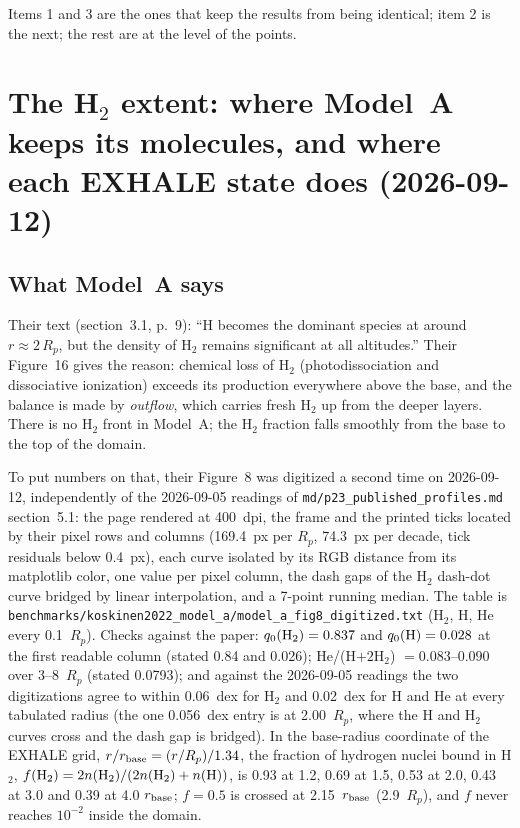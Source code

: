 \documentclass[english,a4paper]{my_memo}
\begin{document}
Items 1 and 3 are the ones that keep the results from being identical;
item 2 is the next; the rest are at the level of the points.


\section{The H$_2$ extent: where Model~A keeps its molecules, and where each EXHALE state does (2026-09-12)}
\label{sec:h2extent}

\subsection{What Model~A says}

Their text (section~3.1, p.~9): ``H becomes the dominant species at around
$r \approx 2\,R_p$, but the density of H$_2$ remains significant at all
altitudes.'' Their Figure~16 gives the reason: chemical loss of H$_2$
(photodissociation and dissociative ionization) exceeds its production
everywhere above the base, and the balance is made by \emph{outflow}, which
carries fresh H$_2$ up from the deeper layers. There is no H$_2$ front in
Model~A; the H$_2$ fraction falls smoothly from the base to the top of the
domain.

To put numbers on that, their Figure~8 was digitized a second time on
2026-09-12, independently of the 2026-09-05 readings of
\texttt{md/p23\_published\_profiles.md} section~5.1: the page rendered at
400~dpi, the frame and the printed ticks located by their pixel rows and
columns (169.4~px per $R_p$, 74.3~px per decade, tick residuals below
0.4~px), each curve isolated by its RGB distance from its matplotlib color,
one value per pixel column, the dash gaps of the H$_2$ dash-dot curve bridged
by linear interpolation, and a 7-point running median. The table is
\texttt{benchmarks/koskinen2022\_model\_a/model\_a\_fig8\_digitized.txt} (H$_2$,
H, He every 0.1~$R_p$). Checks against the paper: $q_0({\rm H}_2) = 0.837$ and
$q_0({\rm H}) = 0.028$ at the first readable column (stated 0.84 and 0.026);
He/(H$+2$H$_2$) $= 0.083$--$0.090$ over 3--8~$R_p$ (stated 0.0793); and
against the 2026-09-05 readings the two digitizations agree to within
0.06~dex for H$_2$ and 0.02~dex for H and He at every tabulated radius (the
one 0.056~dex entry is at 2.00~$R_p$, where the H and H$_2$ curves cross and
the dash gap is bridged). In the base-radius coordinate of the EXHALE grid,
$r/r_{\rm base} = (r/R_p)/1.34$, the fraction of hydrogen nuclei bound in
H$_2$, $f({\rm H}_2) = 2n({\rm H}_2)/(2n({\rm H}_2)+n({\rm H}))$, is
0.93 at 1.2, 0.69 at 1.5, 0.53 at 2.0, 0.43 at 3.0 and 0.39 at 4.0
$r_{\rm base}$; $f = 0.5$ is crossed at 2.15~$r_{\rm base}$ (2.9~$R_p$), and
$f$ never reaches $10^{-2}$ inside the domain.
\end{document}

